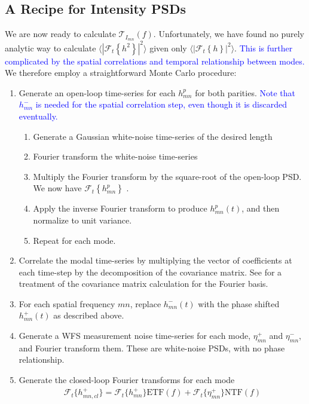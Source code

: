 \documentclass[10pt,preprint]{aastex631}
\newcommand{\jrmadd}[1]{\textcolor{blue}{#1}}
\begin{document}
\subsection{A Recipe for Intensity PSDs}
\label{sect:recipe}
We are now ready to calculate $\mathcal{T}_{I_{mn}}(f)$.  Unfortunately, we have found no purely analytic way to calculate $\langle \left| \mathcal{F}_t\left\{ h^2 \right\} \right|^2 \rangle$ given only $\langle \left| \mathcal{F}_t\left\{ h \right\} \right|^2 \rangle$. \jrmadd{ This is further complicated by the spatial correlations and temporal relationship between modes.}  We therefore employ a straightforward Monte Carlo procedure:
\begin{enumerate}
\item Generate an open-loop time-series for each $h_{mn}^p$ for both parities.  \jrmadd{Note that $h_{mn}^-$ is needed for the spatial correlation step, even though it is discarded eventually.} \label{step:olh}
\begin{enumerate}
\item Generate a Gaussian white-noise time-series of the desired length
\item Fourier transform the white-noise time-series
\item Multiply the Fourier transform by the square-root of the open-loop PSD.  We now have $\mathcal{F}_t\left\{h_{mn}^p\right\}$ \citep[cf.][]{kasdin_falpha}.
\item Apply the inverse Fourier transform to produce $h_{mn}^p(t)$, and then normalize to unit variance.
\item Repeat for each mode.
\end{enumerate}
\item Correlate the modal time-series by multiplying the vector of coefficients at each time-step by the decomposition of the covariance matrix.  See \citet{2018JATIS...4a9001M} for a treatment of the covariance matrix calculation for the Fourier basis.
\item For each spatial frequency $mn$, replace $h_{mn}^-(t)$ with the phase shifted $h_{mn}^+(t)$ as described above.
\item Generate a WFS measurement noise time-series for each mode, $\eta_{mn}^+$ and $\eta_{mn}^-$, and Fourier transform them.  These are white-noise PSDs, with no phase relationship.
\item Generate the closed-loop Fourier transforms for each mode \label{step:clh}
\begin{eqnarray}
\mathcal{F}_t\{h_{mn,cl}^+\} = \mathcal{F}_t\{h_{mn}^+\} \mathrm{ETF}(f) + \mathcal{F}_t\{\eta_{mn}^+\} \mathrm{NTF}(f) \\

\end{eqnarray}
\end{enumerate}
\end{document}
